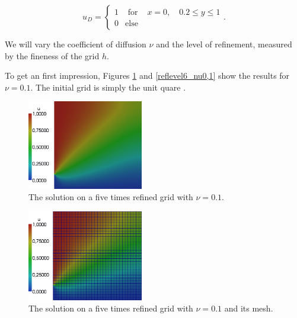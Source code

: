 \documentclass[a4paper, 11pt, twoside]{article}
\begin{document}
	\begin{equation}
	u_{D} = \left\{\begin{array}{rcl}
	1 & \text{ for } & x = 0, \quad 0.2 \leq y \leq 1 \\
	0 & \mathrm{ else } & 
	\end{array}
	\right. .
	\label{DirichletBC}
	\end{equation}

We will vary the coefficient of diffusion $\nu$ and the level of refinement, measured by the fineness of the grid $h$.

To get an first impression, Figures \ref{reflevel5_nu0,1} and \ref{reflevel6_nu0,1} show the results for $\nu = 0.1$. The initial grid is simply the unit quare .

\begin{figure}[htbp]
\begin{center}
\includegraphics[width=0.45\textwidth]{fig/5_0,1.png}
\caption{The solution on a five times refined grid with $\nu = 0.1$.}
\label{reflevel5_nu0,1}
\end{center}
\end{figure}

\begin{figure}[htbp]
\begin{center}
\includegraphics[width=0.45\textwidth]{fig/5_0,1_mit_Gitter.png}
\caption{The solution on a five times refined grid with $\nu = 0.1$ and its mesh.}
\label{}
\end{center}
\end{figure}
\end{document}
